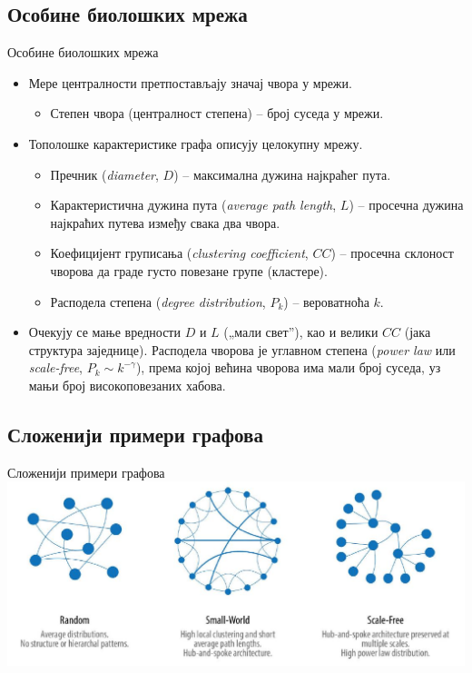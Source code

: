 \documentclass[hyperref={bookmarks=false}]{beamer}
\begin{document}
\subsection{Особине биолошких мрежа}
\begin{frame}{Особине биолошких мрежа}
\begin{itemize}
	\item Мере централности претпостављају значај чвора у мрежи.
	\begin{itemize}
		\item Степен чвора (централност степена) -- број суседа у мрежи.
	\end{itemize}

	\item Тополошке карактеристике графа описују целокупну мрежу.
	\begin{itemize}
		\item Пречник (\textit{diameter}, $D$) -- максимална дужина најкраћег пута.
		\item Карактеристична дужина пута (\textit{average path length}, $L$) -- просечна дужина најкраћих путева између свака два чвора.
		\item Коефицијент груписања (\textit{clustering coefficient}, $CC$) -- просечна склоност чворова да граде густо повезане групе (кластере).
		\item Расподела степена (\textit{degree distribution}, $P_k$) -- вероватноћа $k$.
	\end{itemize}

	\item Очекују се мање вредности $D$ и $L$ („мали свет”), као и велики $CC$ (јака структура заједнице). Расподела чворова је углавном степена (\textit{power law} или \textit{scale-free}, $P_k \sim k^{-\gamma}$), према којој већина чворова има мали број суседа, уз мањи број високоповезаних хабова.
\end{itemize}
\end{frame}

\subsection{Сложенији примери графова}
\begin{frame}{Сложенији примери графова}
\centering\includegraphics[width=.95\textwidth]{osobine.jpg}
\end{frame}
\end{document}
